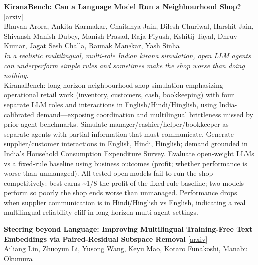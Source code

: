 \documentclass[12pt,letterpaper]{article}
\begin{document}
\medskip

{\small\textbf{KiranaBench: Can a Language Model Run a Neighbourhood Shop?}} {\scriptsize[\href{https://arxiv.org/abs/2610.22980}{arxiv}]}\\
{\scriptsize Bhuvan Arora, Ankita Karmakar, Chaitanya Jain, Dilesh Churiwal, Harshit Jain, Shivansh Manish Dubey, Manish Prasad, Raja Piyush, Kshitij Tayal, Dhruv Kumar, Jagat Sesh Challa, Raunak Manekar, Yash Sinha}\\

{\small\textit{In a realistic multilingual, multi-role Indian kirana simulation, open LLM agents can underperform simple rules and sometimes make the shop worse than doing nothing.}}\\[1pt]
{\footnotesize KiranaBench: long-horizon neighbourhood-shop simulation emphasizing operational retail work (inventory, customers, cash, bookkeeping) with four separate LLM roles and interactions in English/Hindi/Hinglish, using India-calibrated demand---exposing coordination and multilingual brittleness missed by prior agent benchmarks. Simulate manager/cashier/helper/bookkeeper as separate agents with partial information that must communicate. Generate supplier/customer interactions in English, Hindi, Hinglish; demand grounded in India's Household Consumption Expenditure Survey. Evaluate open-weight LLMs vs a fixed-rule baseline using business outcomes (profit; whether performance is worse than unmanaged). All tested open models fail to run the shop competitively: best earns \textasciitilde{}1/8 the profit of the fixed-rule baseline; two models perform so poorly the shop ends worse than unmanaged. Performance drops when supplier communication is in Hindi/Hinglish vs English, indicating a real multilingual reliability cliff in long-horizon multi-agent settings.}

\medskip

{\small\textbf{Steering beyond Language: Improving Multilingual Training-Free Text Embeddings via Paired-Residual Subspace Removal}} {\scriptsize[\href{https://arxiv.org/abs/2610.23807}{arxiv}]}\\
{\scriptsize Ailiang Lin, Zhuoyun Li, Yusong Wang, Keyu Mao, Kotaro Funakoshi, Manabu Okumura}\\
\end{document}
